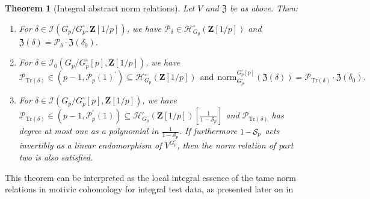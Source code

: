 \documentclass{amsart}%
\theoremstyle{plain}
\newtheorem{thm}{Theorem}[subsection]
\newcommand\scalemath[2]{\scalebox{#1}{\mbox{\ensuremath{\displaystyle #2}}}}
\theoremstyle{plain}
\theoremstyle{remark}
\begin{document}
\begin{thm}[Integral abstract norm relations]\label{thm local norm relations}
    Let $V$ and $\mathfrak{Z}$ be as above. Then:
    \begin{enumerate}
        \item For $\delta\in\mathcal{I}(G_p/G_p^\circ,\mathbf{Z}[1/p])$, we have $\mathcal{P}_\delta\in\mathcal{H}_{G_p}^\circ(\mathbf{Z}[1/p])$ and $\mathfrak{Z}(\delta)=\mathcal{P}_\delta\cdot \mathfrak{Z}(\delta_0)$.
        \item For $\delta\in\mathcal{I}_0(G_p/G_p^\circ[p],\mathbf{Z}[1/p])$, we have $$ \mathcal{P}_{\mathrm{Tr}(\delta)}\in\left(p-1,\mathcal{P}_p(1)^{'}\right)\subseteq \mathcal{H}_{G_p}^\circ(\mathbf{Z}[1/p])\ \ \text{and}\ \ \mathrm{norm}^{G_p^\circ[p]}_{G_p^\circ}\left(\mathfrak{Z}(\delta)\right)=\mathcal{P}_{\mathrm{Tr}(\delta)}\cdot \mathfrak{Z}(\delta_0).$$
        \item For $\delta\in\mathcal{I}(G_p/G_p^\circ[p],\mathbf{Z}[1/p])$, we have $\mathcal{P}_{\mathrm{Tr}(\delta)}\in\left(p-1,\mathcal{P}_p^{'}(1)\right)\subseteq\mathcal{H}_{G_p}^\circ(\mathbf{Z}[1/p])[\tfrac{1}{1-\mathcal{S}_p}]$ and $\mathcal{P}_{\mathrm{Tr}(\delta)}$ has degree at most one as a polynomial in $\tfrac{1}{1-\mathcal{S}_p}$. If furthermore $\scalemath{0.9}{1-\mathcal{S}_p}$ acts invertibly as a linear endomorphism of $V^{G_p^\circ}$, then the norm relation of part two is also satisfied.
    \end{enumerate}
    \end{thm}
\noindent This theorem can be interpreted as the local integral essence of the tame norm relations in motivic cohomology
for integral test data, as presented later on in 
\end{document}
